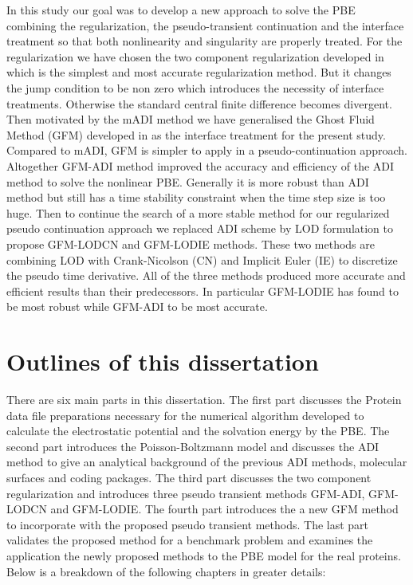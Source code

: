 In this study our goal was to develop a new approach to solve the PBE combining the regularization, the pseudo-transient continuation and the interface treatment so that both nonlinearity and singularity are properly treated. For the regularization we have chosen  the two component regularization developed in \cite{Geng2017a} which is the simplest and most accurate regularization method. But it changes the jump condition to be non zero which introduces the necessity of interface treatments. Otherwise the standard central finite difference becomes divergent. Then motivated by the mADI method we have generalised the Ghost Fluid Method (GFM) developed in \cite{Fedkiw1999} as the interface treatment for the present study. Compared to mADI, GFM is simpler to apply in a pseudo-continuation approach. Altogether GFM-ADI method improved the accuracy and efficiency of the ADI method to solve the nonlinear PBE. Generally it is more robust than ADI method but still has a time stability constraint when the time step size is too huge. Then to continue the search of a more stable method for our regularized pseudo continuation approach we replaced ADI scheme by LOD formulation to propose GFM-LODCN and GFM-LODIE methods. These two methods are combining LOD  with Crank-Nicolson (CN) and Implicit Euler (IE) to discretize the pseudo time derivative. All of the three methods produced more accurate and efficient results  than their predecessors. In particular GFM-LODIE has found to be most  robust while GFM-ADI to be most accurate. 
\section{Outlines of this dissertation}
There are six main parts in this dissertation. The first part discusses the Protein data file preparations necessary for the numerical algorithm developed to calculate the electrostatic potential and the solvation energy by the PBE. The second part introduces the Poisson-Boltzmann model and discusses the ADI method \cite{Geng2013_Fully} to give an analytical background of the previous ADI methods, molecular surfaces and coding packages. The third part discusses the two component regularization and introduces three pseudo transient methods GFM-ADI, GFM-LODCN and GFM-LODIE.  The fourth part introduces the a new GFM method to incorporate with the proposed pseudo transient methods. The last part validates the proposed method for a benchmark problem and examines the application the newly proposed methods to the PBE model for the real proteins. Below is a breakdown of the following chapters in greater details:  
  

